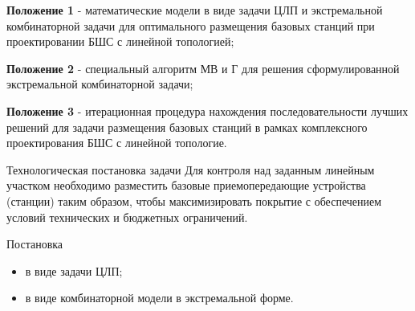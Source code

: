 \begin{frame}
    \justifying
    \begin{center}
        {\textbf{Положение 1} - математические модели в виде задачи ЦЛП и экстремальной комбинаторной задачи для оптимального размещения базовых станций при проектировании БШС с линейной топологией;}
        \bigskip
        
        {\textbf{Положение 2} - специальный алгоритм МВ и Г для решения сформулированной
        экстремальной комбинаторной задачи;}
        \bigskip

        {\textbf{Положение 3} - итерационная процедура нахождения последовательности лучших
        решений для задачи размещения базовых станций в рамках комплексного
        проектирования БШС с линейной топологие.}
    \end{center}
\end{frame}

\begin{frame}
    {Технологическая постановка задачи} 
    \justifying
    Для контроля над заданным линейным участком необходимо разместить базовые приемопередающие устройства (станции) таким образом, чтобы максимизировать покрытие с обеспечением условий технических и бюджетных ограничений. 

    \bigskip
    
    Постановка
    \begin{itemize}
        \item в виде задачи ЦЛП;
        \item в виде комбинаторной модели в экстремальной форме.
    \end{itemize}

\end{frame}


